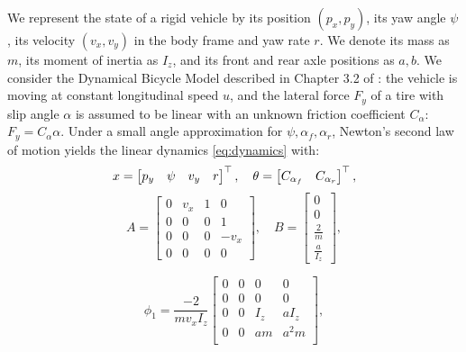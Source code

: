 \documentclass[letterpaper, 10 pt, conference]{ieeeconf}  %
\begin{document}
We represent the state of a rigid vehicle by its position $(p_x, p_y)$, its yaw angle $\psi$, its velocity $(v_x, v_y)$ in the body frame and yaw rate $r$. We denote its mass as $m$, its moment of inertia as $I_z$, and its front and rear axle positions as $a,b$. We consider the Dynamical Bicycle Model described in Chapter 3.2 of \cite{awan2014compensation}: the vehicle is moving at constant longitudinal speed $u$, and the lateral force $F_y$ of a tire with slip angle $\alpha$ is assumed to be linear with an unknown friction coefficient $C_\alpha$: $F_y = C_\alpha \alpha$.
Under a small angle approximation for $\psi, \alpha_f, \alpha_r$, Newton's second law of motion yields the linear dynamics \eqref{eq:dynamics} with:
\begin{align*}
x = \begin{bmatrix} {p_y} & {\psi} & {v_y} & {r} \end{bmatrix}^\top,\quad
\theta = \begin{bmatrix} C_{\alpha_f} & C_{\alpha_r}\end{bmatrix}^\top,
\end{align*}
\[
A = \begin{bmatrix}
0 & v_x & 1 & 0 \\
0 & 0 & 0 & 1 \\
0 & 0 & 0 & - v_x \\
0 & 0 & 0 & 0
\end{bmatrix},\quad
B =
\begin{bmatrix}
0 \\
0 \\
\frac{2}{m} \\
\frac{a}{I_z}
\end{bmatrix},
\]

\[
\phi_1 = \frac{-2}{m v_x I_z}\begin{bmatrix}
0 & 0 & 0 & 0 \\
0 & 0 & 0 & 0 \\
0 & 0 & I_z & a I_z \\
0 & 0 & a m & a^2 m \\
\end{bmatrix},
\]
\end{document}
